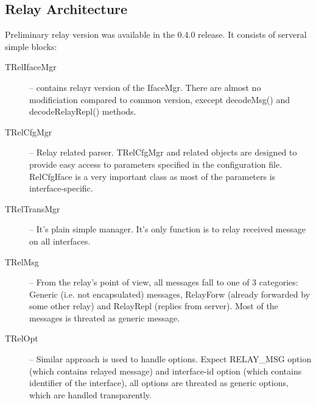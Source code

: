 \subsection{Relay Architecture}
Preliminary relay version was available in the 0.4.0 release. It
consists of serveral simple blocks:
\begin{description}
\item[TRelIfaceMgr] -- contains relayr version of the IfaceMgr. There
  are almost no modificiation compared to common version, execept
  decodeMsg() and decodeRelayRepl() methods.
\item[TRelCfgMgr] -- Relay related parser. TRelCfgMgr and related
  objects are designed to provide easy access to parameters specified
  in the configuration file. RelCfgIface is a very important class as
  most of the parameters is interface-specific.
\item[TRelTransMgr] -- It's plain simple manager. It's only function
  is to relay received message on all interfaces.
\item[TRelMsg] -- From the relay's point of view, all messages fall to
  one of 3 categories: Generic (i.e. not encapsulated) messages,
  RelayForw (already forwarded by some other relay) and RelayRepl
  (replies from server). Most of the messages is threated as generic
  message.
\item[TRelOpt] -- Similar approach is used to handle options. Expect
  RELAY\_MSG option (which contains relayed message) and interface-id
  option (which contains identifier of the interface), all options are
  threated as generic options, which are handled transparently.
\end{description}

